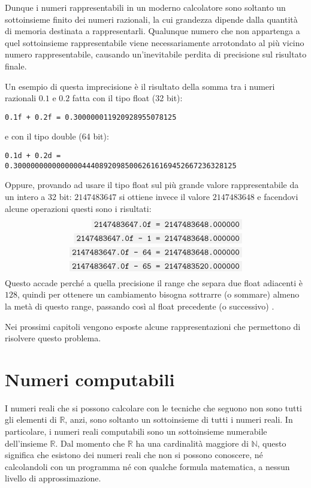 \documentclass[Lau]{sapthesis}
\newcommand{\code}[1]{\colorbox{light-gray}{\texttt{#1}}}
\begin{document}
Dunque i numeri rappresentabili in un moderno calcolatore sono soltanto un 
sottoinsieme finito dei numeri razionali, la cui grandezza dipende dalla quantità di 
memoria destinata a rappresentarli. Qualunque numero che non appartenga a quel 
sottoinsieme rappresentabile viene necessariamente arrotondato al più vicino 
numero rappresentabile, causando un'inevitabile perdita di precisione sul 
risultato finale.

Un esempio di questa imprecisione è il risultato della somma tra i numeri razionali $0.1$ e $0.2$ fatta con il tipo float (32 bit):
\begin{center}
\code{0.1f + 0.2f = 0.300000011920928955078125}
\end{center}
e con il tipo double (64 bit):
\begin{center}
\code{0.1d + 0.2d =}\\
\code{0.3000000000000000444089209850062616169452667236328125}
\end{center}

Oppure, provando ad usare il tipo float sul più grande valore rappresentabile da un intero a 32 bit: $2147483647$ si ottiene invece il valore $2147483648$ e facendovi alcune operazioni questi sono i risultati:
\begin{align*}
\code{2147483647.0f = 2147483648.000000}\\
\code{2147483647.0f - 1 = 2147483648.000000}\\
\code{2147483647.0f - 64 = 2147483648.000000}\\
\code{2147483647.0f - 65 = 2147483520.000000}\\
\end{align*}
Questo accade perché a quella precisione il range che separa due float adiacenti è $128$, quindi per ottenere un cambiamento bisogna sottrarre (o sommare) almeno la metà di questo range, passando così al float precedente (o successivo) \cite{97Things}.

\medskip

Nei prossimi capitoli vengono esposte alcune rappresentazioni che 
permettono di risolvere questo problema.


\section{Numeri computabili}
I numeri reali che si possono calcolare con le tecniche che seguono non sono tutti gli elementi di $\mathbb{R}$, anzi, sono soltanto un sottoinsieme di tutti i numeri reali. In particolare, i numeri reali computabili sono un sottoinsieme numerabile dell'insieme $\mathbb{R}$. Dal momento che $\mathbb{R}$ ha una cardinalità maggiore di $\mathbb{N}$, questo significa che esistono dei numeri reali che non si possono conoscere, né calcolandoli con un programma né con qualche formula matematica, a nessun livello di approssimazione.
\end{document}
